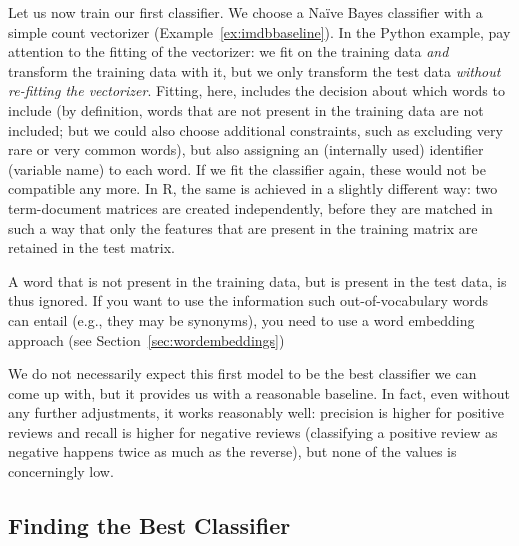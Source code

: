Let us now train our first classifier. We choose a Na\"ive Bayes
classifier with a simple count vectorizer (Example~\ref{ex:imdbbaseline}).  In
the Python example, pay attention to the fitting of the vectorizer: we
fit on the training data \emph{and} transform the training data with
it, but we only transform the test data \emph{without re-fitting the
  vectorizer}. Fitting, here, includes the decision about which words to
include (by definition, words that are not present in the training
data are not included; but we could also choose additional
constraints, such as excluding very rare or very common words), but
also assigning an (internally used) identifier (variable name) to each
word. If we  fit the classifier again, these would not be
compatible any more. In R, the same is achieved in a slightly
different way: two term-document matrices are created independently,
before they are matched in such a way that only the features that are
present in the training matrix are retained in the test matrix.


\begin{feature}
  A word that is not present in the training data, but is present
  in the test data, is thus ignored. If you want to use the
  information such out-of-vocabulary words can entail (e.g., they may
  be synonyms), you need to use a word embedding approach (see Section~\ref{sec:wordembeddings})
\end{feature}

We do not necessarily expect this first model to be the best
classifier we can come up with, but it provides us with a reasonable
baseline. In fact, even without any further adjustments, it works
reasonably well: precision is higher for positive reviews and recall
is higher for negative reviews (classifying a positive review as
negative happens twice as much as the reverse), but none of the values
is concerningly low.




\subsection{Finding the Best Classifier}



